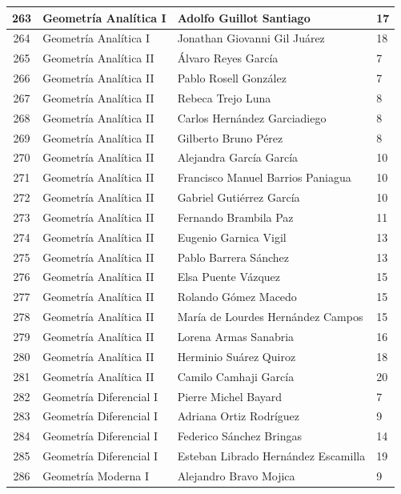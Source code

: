 {\begin{longtable}{|c|p{6.5cm}|p{5cm}|p{1.5cm}|}
263 & Geometría Analítica I & Adolfo Guillot Santiago & 17 \\ \hline
264 & Geometría Analítica I & Jonathan Giovanni Gil Juárez & 18 \\ \hline
265 & Geometría Analítica II & Álvaro Reyes García & 7 \\ \hline
266 & Geometría Analítica II & Pablo Rosell González & 7 \\ \hline
267 & Geometría Analítica II & Rebeca Trejo Luna & 8 \\ \hline
268 & Geometría Analítica II & Carlos Hernández Garciadiego & 8 \\ \hline
269 & Geometría Analítica II & Gilberto Bruno Pérez & 8 \\ \hline
270 & Geometría Analítica II & Alejandra García García & 10 \\ \hline
271 & Geometría Analítica II & Francisco Manuel Barrios Paniagua & 10 \\ \hline
272 & Geometría Analítica II & Gabriel Gutiérrez García & 10 \\ \hline
273 & Geometría Analítica II & Fernando Brambila Paz & 11 \\ \hline
274 & Geometría Analítica II & Eugenio Garnica Vigil & 13 \\ \hline
275 & Geometría Analítica II & Pablo Barrera Sánchez & 13 \\ \hline
276 & Geometría Analítica II & Elsa Puente Vázquez & 15 \\ \hline
277 & Geometría Analítica II & Rolando Gómez Macedo & 15 \\ \hline
278 & Geometría Analítica II & María de Lourdes Hernández Campos & 15 \\ \hline
279 & Geometría Analítica II & Lorena Armas Sanabria & 16 \\ \hline
280 & Geometría Analítica II & Herminio Suárez Quiroz & 18 \\ \hline
281 & Geometría Analítica II & Camilo Camhaji García & 20 \\ \hline
282 & Geometría Diferencial I & Pierre Michel Bayard & 7 \\ \hline
283 & Geometría Diferencial I & Adriana Ortiz Rodríguez & 9 \\ \hline
284 & Geometría Diferencial I & Federico Sánchez Bringas & 14 \\ \hline
285 & Geometría Diferencial I & Esteban Librado Hernández Escamilla & 19 \\ \hline
286 & Geometría Moderna I & Alejandro Bravo Mojica & 9 \\ \hline

\end{longtable}}
